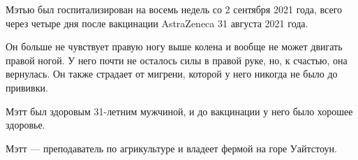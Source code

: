 Мэтью был госпитализирован на восемь недель со 2 сентября 2021 года, всего через
четыре дня после вакцинации AstraZeneca 31 августа 2021 года.

Он больше не чувствует правую ногу выше колена и вообще не может двигать правой
ногой. У него почти не осталось силы в правой руке, но, к счастью, она
вернулась. Он также страдает от мигрени, которой у него никогда не было до
прививки.

Мэтт был здоровым 31-летним мужчиной, и до вакцинации у него было хорошее
здоровье.

Мэтт — преподаватель по агрикультуре и владеет фермой на горе Уайтстоун.
